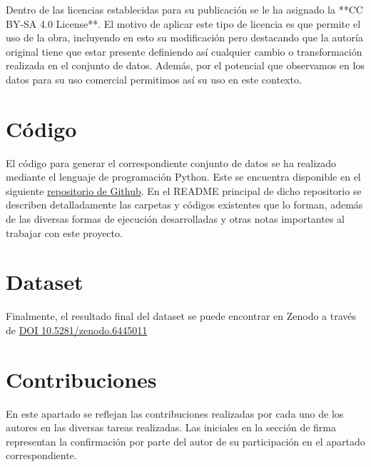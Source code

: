 Dentro de las licencias establecidas para su publicación se le ha asignado la **CC BY-SA 4.0 License**. El motivo de aplicar 
este tipo de licencia es que permite el uso de la obra, incluyendo en esto su modificación pero destacando que la autoría 
original tiene que estar presente definiendo así cualquier cambio o transformación realizada en el conjunto de datos. Además, 
por el potencial que observamos en los datos para su uso comercial permitimos así su uso en este contexto.

\section{Código}

El código para generar el correspondiente conjunto de datos se ha realizado mediante el lenguaje de programación Python. 
Este se encuentra disponible en el siguiente \href{https://github.com/jvruoc/rent_prices}{repositorio de Github}. 
En el README principal de dicho repositorio se describen detalladamente las carpetas y códigos existentes que lo 
forman, además de las diversas formas de ejecución desarrolladas y otras notas importantes al trabajar con este proyecto.

\section{Dataset}

Finalmente, el resultado final del dataset se puede encontrar en Zenodo a través 
de \href{https://doi.org/10.5281/zenodo.6445011}{DOI 10.5281/zenodo.6445011}

\section{Contribuciones}

En este apartado se reflejan las contribuciones realizadas por cada uno de 
los autores en las diversas tareas realizadas. Las iniciales en la sección 
de firma representan la confirmación por parte del autor de su participación 
en el apartado correspondiente.

